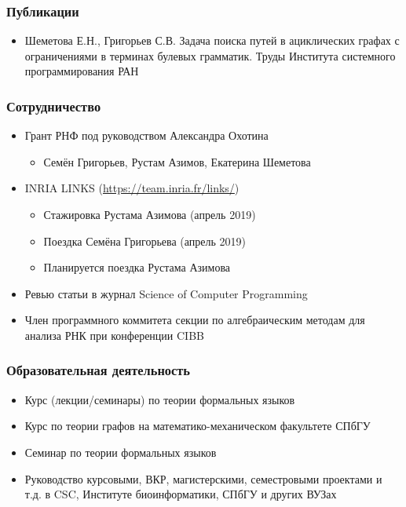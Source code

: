 \documentclass[xcolor=table]{beamer}
\begin{document}
\begin{frame}[fragile]
  \transwipe[direction=90]
  \frametitle{Публикации}
\begin{itemize}
      \item Шеметова Е.Н., Григорьев С.В. Задача поиска путей в ациклических графах с ограничениями в терминах булевых грамматик. Труды Института системного программирования РАН
\end{itemize}
\end{frame}

\begin{frame}[fragile]
  \transwipe[direction=90]
  \frametitle{Сотрудничество}
\begin{itemize}
      \item Грант РНФ под руководством Александра Охотина
      \begin{itemize}
        \item Семён Григорьев, Рустам Азимов, Екатерина Шеметова
      \end{itemize}
      \item INRIA LINKS (\url{https://team.inria.fr/links/})
      \begin{itemize}
         \item Стажировка Рустама Азимова (апрель 2019)
         \item Поездка Семёна Григорьева (апрель 2019)
         \item Планируется поездка Рустама Азимова
      \end{itemize}
      \pause
      \item Ревью статьи в журнал Science of Computer Programming
      \item Член программного коммитета секции по алгебраическим методам для анализа РНК при конференции CIBB

\end{itemize}
\end{frame}

\begin{frame}[fragile]
  \transwipe[direction=90]
  \frametitle{Образовательная деятельность}
\begin{itemize}
      \item Курс (лекции/семинары) по теории формальных языков
      \item Курс по теории графов на математико-механическом факультете СПбГУ
      \item Семинар по теории формальных языков
      \item Руководство курсовыми, ВКР, магистерскими, семестровыми проектами и т.д. в CSC, Институте биоинформатики, СПбГУ и других ВУЗах
\end{itemize}
\end{frame}
\end{document}
